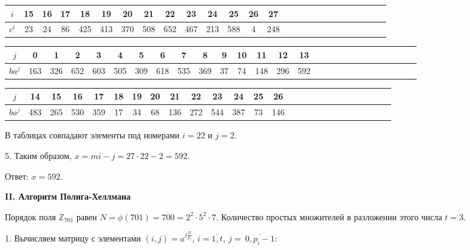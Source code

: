 \documentclass[a4paper,11pt,openany]{book}
\begin{document}
\medskip

{\centering
\begin{tabular}{||c|c|c|c|c|c|c|c|c|c|c|c|c|c|c|c|c|c|c|c|c|c|c|c|c|c||}
\hline
$i$ & 15 & 16 & 17 & 18 & 19 & 20 & 21 & 22 & 23 & 24 & 25 & 26 & 27 \\
\hline
$c^i$ & 23 & 24 & 86 & 425 & 413 & 370 & 508 & 652 & 467 & 213 & 588 & 4 & 248 \\
\hline
\end{tabular}

}

\medskip

{\centering
\begin{tabular}{||c|c|c|c|c|c|c|c|c|c|c|c|c|c|c|c|c|c|c|c|c|c|c|c|c|c|c||}
\hline
$j$ & 0 & 1 & 2 & 3 & 4 & 5 & 6 & 7 & 8 & 9 & 10 & 11 & 12 & 13 \\
\hline
$ba^j$ & 163 & 326 & 652 & 603 & 505 & 309 & 618 & 535 & 369 & 37 & 74 & 148 & 296 & 592 \\
\hline
\end{tabular}

}

\medskip

{\centering
\begin{tabular}{||c|c|c|c|c|c|c|c|c|c|c|c|c|c|c|c|c|c|c|c|c|c|c|c|c|c||}
\hline
$j$ & 14 & 15 & 16 & 17 & 18 & 19 & 20 & 21 & 22 & 23 & 24 & 25 & 26 \\
\hline
$ba^j$ & 483 & 265 & 530 & 359 & 17 & 34 & 68 & 136 & 272 & 544 & 387 & 73 & 146 \\
\hline
\end{tabular}

}

\medskip

\noindent В таблицах совпадают элементы под номерами $i = 22$ и $j = 2.$

5. Таким образом, $x = mi - j = 27 \cdot 22 - 2 = 592.$ 

\noindent Ответ: $x = 592$.

\noindent \textbf{II. Алгоритм Полига-Хеллмана}

Порядок поля $\mathbb{Z}_{701}$ равен $N = \phi(701) = 700 = 2 ^ 2 \cdot 5 ^ 2 \cdot 7$. Количество простых множителей в разложении этого числа $t = 3$.

1. Вычисляем матрицу с элементами $(i, j) = a ^ { j  \frac{N}{p_i}} $, $i = \overline{1, t},\ j =~\overline{0, p_i - 1}$:

\medskip
\end{document}
